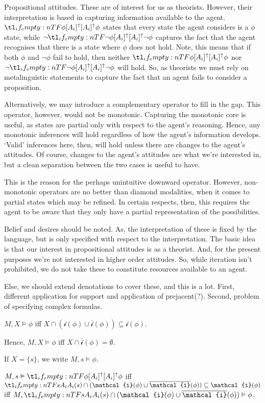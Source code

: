 \documentclass[10pt]{article}
\newcommand{\intp}{\ensuremath{\mathcal{i}}}
\newcommand{\cintp}[1]{\ensuremath{\intp(#1)}}
\newcommand{\iintp}[1]{\ensuremath{\overline{\intp}(#1)}}
\begin{document}
\begin{note}
  Propositional attitudes.
  These are of interest for us as theorists.
  However, their interpretation is based in capturing information available to the agent.
  \(\lattu{\phi}\) states that every state the agent considers is a \(\phi\) state, while \(\lnot\lattu{\lnot\phi}\) captures the fact that the agent recognises that there is a state where \(\phi\) does not hold.
  Note, this means that if both \(\phi\) and \(\lnot\phi\) fail to hold, then neither \(\lattu{\phi}\) nor \(\lnot\lattu{\lnot\phi}\) will hold.
  So, as theorists we must rely on metalinguistic statements to capture the fact that an agent fails to consider a proposition.

  Alternatively, we may introduce a complementary operator to fill in the gap.
  This operator, however, would not be monotonic.
  Capturing the monotonic core is useful, as states are partial only with respect to the agent's reasoning.
  Hence, any monotonic inferences will hold regardless of how the agent's information develops.
  `Valid' inferences here, then, will hold unless there are changes to the agent's attitudes.
  Of course, changes to the agent's attitudes are what we're interested in, but a clean separation between the two cases is useful to have.

  This is the reason for the perhaps unintuitive downward operator.
  However, non-monotonic operators are no better than diamond modalities, when it comes to partial states which may be refined.
  In certain respects, then, this requires the agent to be aware that they only have a partial representation of the possibilities.
\end{note}



Belief and desires should be noted.
As, the interpretation of these is fixed by the language, but is only specified with respect to the interpretation.
The basic idea is that our interest in propositional attitudes is as a theorist.
And, for the present purposes we're not interested in higher order attitudes.
So, while iteration isn't prohibited, we do not take these to constitute resources available to an agent.

Else, we should extend denotations to cover these, and this is a lot.
First, different application for support and application of prejacent(?).
Second, problem of specifying complex formulas.

\begin{definition}[Support]
  \(M,X \vDash \phi\) iff \(X \cap (\cintp{\phi} \cup \iintp{\phi}) \subseteq \cintp{\phi}\).

  Hence, \(M,X \vDash \phi\) iff \(X \cap \iintp{\phi} = \emptyset\).

  If \(X = \{s\}\), we write \(M,s \vDash \phi\).

  \(M,s \vDash \lattu{\phi}\) iff \(\fatt{s} \cap (\cintp{\phi} \cup \iintp{\phi}) \subseteq \cintp{\phi}\) iff \(M,\fatt{s} \cap (\cintp{\phi} \cup \iintp{\phi}) \vDash \phi\).
\end{definition}
\end{document}
